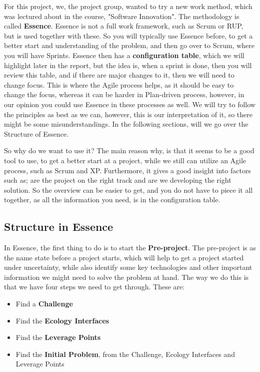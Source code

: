 For this project, we, the project group, wanted to try a new work method, which was lectured about in the course, "Software Innovation".
The methodology is called \textbf{Essence}.
Essence is not a full work framework, such as Scrum or RUP, but is used together with these.
So you will typically use Essence before, to get a better start and understanding of the problem, and then go over to Scrum, where you will have Sprints. 
Essence then has a \textbf{configuration table}, which we will highlight later in the report, but the idea is, when a sprint is done, then you will review this table, and if there are major changes to it, then we will need to change focus.
This is where the Agile process helps, as it should be easy to change the focus, whereas it can be harder in Plan-driven process, however, in our opinion you could use Essence in these processes as well. 
We will try to follow the principles as best as we can, however, this is our interpretation of it, so there might be some misunderstandings.
In the following sections, will we go over the Structure of Essence.

So why do we want to use it?
The main reason why, is that it seems to be a good tool to use, to get a better start at a project, while we still can utilize an Agile process, such as Scrum and XP.
Furthermore, it gives a good insight into factors such as; are the project on the right track and are we developing the right solution.
So the overview can be easier to get, and you do not have to piece it all together, as all the information you need, is in the configuration table.

\subsection{Structure in Essence}
In Essence, the first thing to do is to start the \textbf{Pre-project}.
The pre-project is as the name state before a project starts, which will help to get a project started under uncertainty, while also identify some key technologies and other important information we might need to solve the problem at hand.
The way we do this is that we have four steps we need to get through.
These are:

\begin{itemize}
    \item Find a \textbf{Challenge}
    \item Find the \textbf{Ecology Interfaces}
    \item Find the \textbf{Leverage Points}
    \item Find the \textbf{Initial Problem}, from the Challenge, Ecology Interfaces and Leverage Points
\end{itemize}

